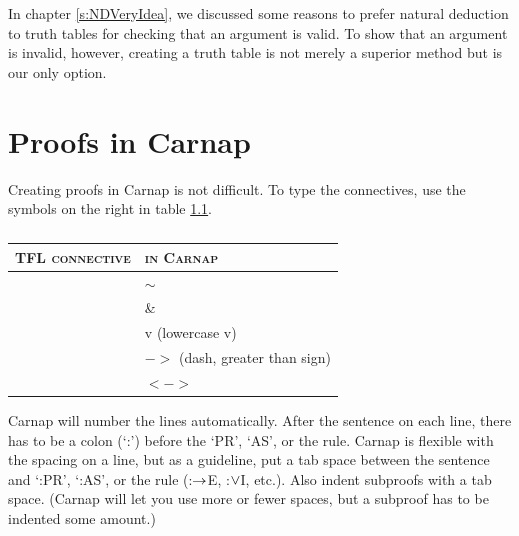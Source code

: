 In chapter \ref{s:NDVeryIdea}, we discussed some reasons to prefer natural deduction to truth tables for checking that an argument is valid. To show that an argument is invalid, however, creating a truth table is not merely a superior method but is our only option.












\chapter{Proofs in Carnap}\label{s:Carnap-proofs}

Creating proofs in Carnap is not difficult. To type the connectives, use the symbols on the right in table \ref{symbols-Carnap}. 

\begin{table}\centering\sffamily\footnotesize
{}
\begin{tabular}{@{}l l@{}}\toprule
\textsc{TFL connective} & \textsc{in Carnap} \\\midrule
	\enot & $ \sim$\\
	\eand & \&\\
	\eor & v (lowercase v)\\
	\eif & $-$$>$ (dash, greater than sign)\\
	\eiff & $<$$-$$>$\\
\bottomrule
\end{tabular}
\caption{}\label{symbols-Carnap}
\end{table}


Carnap will number the lines automatically. After the sentence on each line, there has to be a colon (`:') before the `PR', `AS', or the rule. Carnap is flexible with the spacing on a line, but as a guideline, put a tab space between the sentence and `:PR', `:AS', or the rule (:$\rightarrow$E, :$\vee$I, etc.). Also indent subproofs with a tab space. (Carnap will let you use more or fewer spaces, but a subproof has to be indented some amount.)

